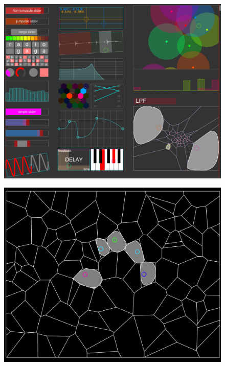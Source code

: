 \begin{figure}
	\centering
	\begin{minipage}{.5\textwidth}
		\includegraphics[width=.98\linewidth]{gfx/mpTUI/mp-TUI-preview.png}
		\label{fig:visual_representation:overview}
	\end{minipage}%
	\begin{minipage}{.5\textwidth}
		\includegraphics[width=.98\linewidth]{gfx/mpTUI/mp-TUI-voronoi.png}
		\label{fig:visual_representation:voronoi}
	\end{minipage}
\end{figure}

